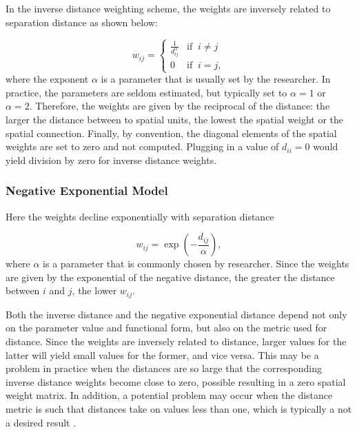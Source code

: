 In the inverse distance weighting scheme, the weights are inversely related to separation distance as shown below:

\begin{equation*}
  w_{ij} =
  \begin{cases}
  \frac{1}{d_{ij}^{\alpha}} & \mbox{if} \;\;i \neq j \\
  0 & \mbox{if}\;\; i = j,
  \end{cases}
\end{equation*}
%
where the exponent $\alpha$ is a parameter that is usually set by the researcher. In practice, the parameters are seldom estimated, but typically set to $\alpha = 1$ or $\alpha = 2$. Therefore, the weights are given by  the reciprocal of the distance: the larger the distance between to spatial units, the lowest the spatial weight or the spatial connection. Finally, by convention, the diagonal elements of the spatial weights are set to zero and not computed. Plugging in a value of $d_{ii} = 0$ would yield division by zero for inverse distance weights. 

\subsubsection{Negative Exponential Model}

Here the weights decline exponentially with separation distance

\begin{equation*}
  w_{ij} = \exp\left(-\frac{d_{ij}}{\alpha}\right),
\end{equation*}
%
where $\alpha$ is a parameter that is commonly chosen by researcher. Since the weights are given by the exponential of the negative distance, the greater the distance between $i$ and $j$, the lower $w_{ij}$.

Both the inverse distance and the negative exponential distance depend not only on the parameter value and functional form, but also on the metric used for distance. Since the weights are inversely related to distance, larger values for the latter will yield small values for the former, and vice versa. This may be a problem in practice when the distances are so large that the corresponding inverse distance weights become close to zero, possible resulting in a zero spatial weight matrix. In addition, a potential problem may occur when the distance metric is such that distances take on values less than one, which is typically a not a desired result \citep{anselin2014modern}. 

